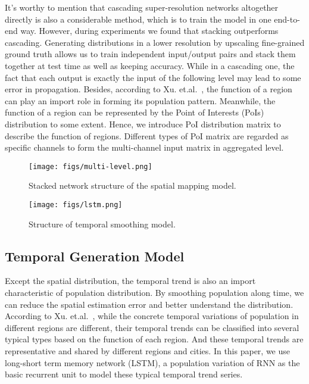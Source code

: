 \documentclass[letterpaper]{article} %
\begin{document}
It's worthy to mention that cascading super-resolution networks altogether directly is also a considerable method, which is to train the model in one end-to-end way. However, during experiments we found that stacking outperforms cascading. Generating distributions in a lower resolution by upscaling fine-grained ground truth allows us to train independent input/output pairs and stack them together at test time as well as keeping accuracy. While in a cascading one, the fact that each output is exactly the input of the following level may lead to some error in propagation\cite{Vandal2017DeepSD}.
Besides, according to Xu. et.al.~\cite{Xu2016ContextawareRP}, the function of a region can play an import role in forming its population pattern. Meanwhile, the function of a region can be represented by the Point of Interests (PoIs) distribution to some extent. Hence, we introduce PoI distribution matrix to describe the function of regions. Different types of PoI matrix are regarded as specific channels to form the multi-channel input matrix in aggregated level.


\begin{figure}[ht]
    \centering
    \texttt{[image: figs/multi-level.png]}
    \caption{Stacked network structure of the spatial mapping model.}
    \label{fig:spatial-model}
\end{figure}

\begin{figure}[ht]
    \centering
    \texttt{[image: figs/lstm.png]}
    \caption{Structure of temporal smoothing model.}
    \label{fig:lstm}
\end{figure}




\subsection{Temporal Generation Model}
Except the spatial distribution, the temporal trend is also an import characteristic of population distribution. By smoothing population along time, we can reduce the spatial estimation error and better understand the distribution. According to Xu. et.al.~\cite{Xu2016ContextawareRP}, while the concrete temporal variations of population in different regions are different, their temporal trends can be classified into several typical types based on the function of each region. And these temporal trends are representative and shared by different regions and cities. In this paper, we use long-short term memory network (LSTM), a population variation of RNN as the basic recurrent unit to model these typical temporal trend series. 
\end{document}

